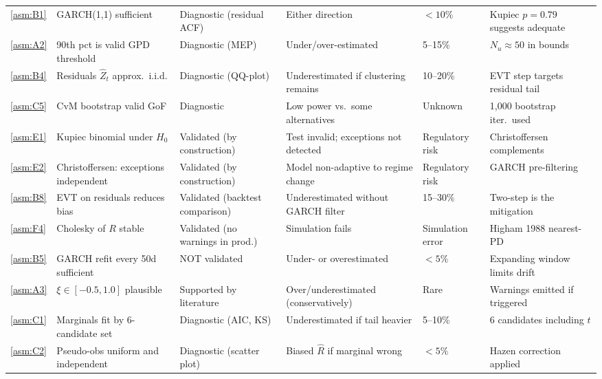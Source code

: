 \documentclass[11pt,a4paper]{article}
\begin{document}
\begin{footnotesize}
\begin{longtable}{@{}p{0.65cm} p{4.0cm} p{2.6cm} p{3.4cm} p{2.0cm} p{2.8cm}@{}}
\cref{asm:B1}  & GARCH(1,1) sufficient & Diagnostic (residual ACF) & Either direction & $<10\%$ & Kupiec $p=0.79$ suggests adequate \\[4pt]

\cref{asm:A2}  & 90th pct is valid GPD threshold & Diagnostic (MEP) & Under/over-estimated & 5--15\% & $N_u\approx 50$ in bounds \\[4pt]

\cref{asm:B4}  & Residuals $\hat{Z}_t$ approx.\ i.i.d. & Diagnostic (QQ-plot) & Underestimated if clustering remains & 10--20\% & EVT step targets residual tail \\[4pt]

\cref{asm:C5}  & CvM bootstrap valid GoF & Diagnostic & Low power vs.\ some alternatives & Unknown & 1{,}000 bootstrap iter.\ used \\[4pt]

\cref{asm:E1}  & Kupiec binomial under $H_0$ & Validated (by construction) & Test invalid; exceptions not detected & Regulatory risk & Christoffersen complements \\[4pt]

\cref{asm:E2}  & Christoffersen: exceptions independent & Validated (by construction) & Model non-adaptive to regime change & Regulatory risk & GARCH pre-filtering \\[4pt]

\cref{asm:B8}  & EVT on residuals reduces bias & Validated (backtest comparison) & Underestimated without GARCH filter & 15--30\% & Two-step is the mitigation \\[4pt]

\cref{asm:F4}  & Cholesky of $R$ stable & Validated (no warnings in prod.) & Simulation fails & Simulation error & Higham 1988 nearest-PD \\[4pt]

\cref{asm:B5}  & GARCH refit every 50d sufficient & NOT validated & Under- or overestimated & $<5\%$ & Expanding window limits drift \\[4pt]

\cref{asm:A3}  & $\xi\in[-0.5,1.0]$ plausible & Supported by literature & Over/underestimated (conservatively) & Rare & Warnings emitted if triggered \\[4pt]

\cref{asm:C1}  & Marginals fit by 6-candidate set & Diagnostic (AIC, KS) & Underestimated if tail heavier & 5--10\% & 6 candidates including $t$ \\[4pt]

\cref{asm:C2}  & Pseudo-obs uniform and independent & Diagnostic (scatter plot) & Biased $\hat{R}$ if marginal wrong & $<5\%$ & Hazen correction applied \\[4pt]


\end{longtable}
\end{footnotesize}
\end{document}
